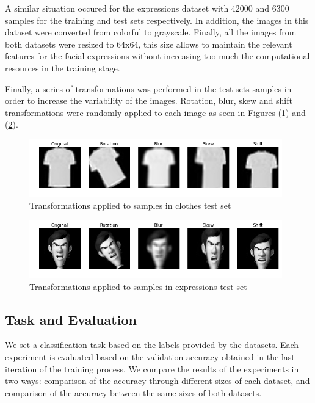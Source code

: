 \documentclass{article}
\begin{document}
A similar situation occured for the expressions dataset with 42000 and 6300 samples for the training and test sets respectively. In addition, the images in this dataset were converted from colorful to grayscale. Finally, all the images from both datasets were resized to 64x64, this size allows to maintain the relevant features for the facial expressions without increasing too much the computational resources in the training stage.

Finally, a series of transformations was performed in the test sets samples in order to increase the variability of the images. Rotation, blur, skew and shift transformations were randomly applied to each image as seen in Figures (\ref{fig:3}) and (\ref{fig:4}).

\begin{figure}[!htb]
	\vskip 5mm
		\begin{center}
			\includegraphics[height=2.5cm]{augmented_clothes}
			\caption{Transformations applied to samples in clothes test set}
			\label{fig:3}
		\end{center}
	\vskip -5mm
\end{figure}

\begin{figure}[!htb]
	\vskip 5mm
		\begin{center}
			\includegraphics[height=2.5cm]{augmented_expressions}
			\caption{Transformations applied to samples in expressions test set}
			\label{fig:4}
		\end{center}
	\vskip -5mm
\end{figure}

\subsection{Task and Evaluation}
\label{sec:evaluation}
We set a classification task based on the labels provided by the datasets. Each experiment is evaluated based on the validation accuracy obtained in the last iteration of the training process. We compare the results of the experiments in two ways: comparison of the accuracy through different sizes of each dataset, and comparison of the accuracy between the same sizes of both datasets.
\end{document}
